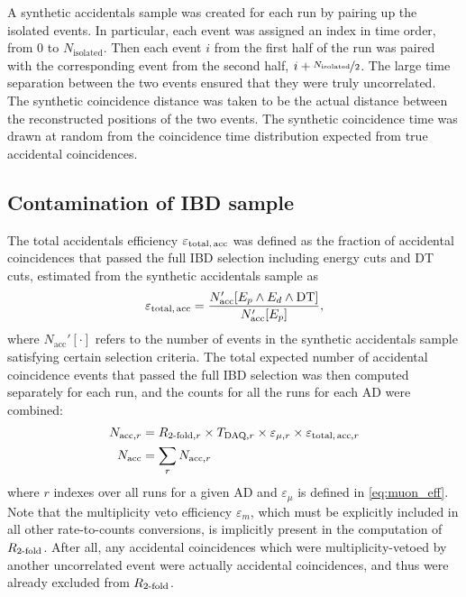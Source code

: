 
A synthetic accidentals sample was created for each run
by pairing up the isolated events.
In particular, each event was assigned an index in time order,
from $0$ to $N_{\text{isolated}}$.
Then each event $i$ from the first half of the run was paired with
the corresponding event from the second half, $i + \nicefrac{N_{\text{isolated}}}{2}$.
The large time separation between the two events
ensured that they were truly uncorrelated.
The synthetic coincidence distance was taken to be the actual distance
between the reconstructed positions of the two events.
The synthetic coincidence time was drawn at random
from the coincidence time distribution
expected from true accidental coincidences.

\subsection{Contamination of IBD sample}
\label{subsec:acc_count}

The total accidentals efficiency $\varepsilon_\text{total,\,acc}$
was defined as the fraction of accidental  coincidences
that passed the full IBD selection including energy cuts and DT cuts,
estimated from the synthetic accidentals sample as
\begin{equation}\label{eq:eps_total_acc}
    \varepsilon_{\text{total,\,acc}} =
    \frac{N_\text{acc}'[E_p \wedge E_d \wedge \text{DT}]}{N_\text{acc}'[E_p]},
\end{equation}
where $N_\text{acc}'[\cdot]$ refers to the number of events
in the synthetic accidentals sample satisfying certain selection criteria.
The total expected number of accidental coincidence events
that passed the full IBD selection was then computed
separately for each run, and the counts for all the runs for each AD were combined:
\begin{align}\label{eq:nacc}
    \begin{split}
        N_{\text{acc},r} &= R_{\text{\ensuremath{2}-fold},r}
            \times T_{\text{DAQ},r}\times \varepsilon_{\mu,r}
            \times \varepsilon_{\text{total,\,acc},r}\\
        N_\text{acc} &= \sum_r N_{\text{acc},r}
    \end{split}
\end{align}
where $r$ indexes over all runs for a given AD
and $\varepsilon_\mu$ is defined in \cref{eq:muon_eff}.
Note that the multiplicity veto efficiency $\varepsilon_m$,
which must be explicitly included in all other rate-to-counts conversions,
is implicitly present in the computation of $R_\text{\ensuremath{2}-fold}$.
After all, any accidental coincidences which were multiplicity-vetoed
by another uncorrelated event were actually  accidental coincidences,
and thus were already excluded from $R_\text{\ensuremath{2}-fold}$.

